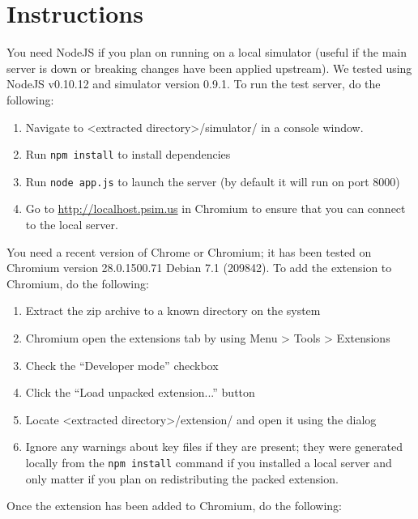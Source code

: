 \documentclass[12pt]{article}
\begin{document}
\maketitle
\section{Instructions}

You need NodeJS if you plan on running on a local simulator (useful if the main server is down or breaking changes have been applied upstream).  We tested using NodeJS v0.10.12 and simulator version 0.9.1.  To run the test server, do the following:

\begin{enumerate}
  \item Navigate to \textless{}extracted directory\textgreater{}/simulator/ in a console window.
  \item Run \texttt{npm install} to install dependencies
  \item Run \texttt{node app.js} to launch the server (by default it will run on port 8000)
  \item Go to \url{http://localhost.psim.us} in Chromium to ensure that you can connect to the local server.
\end{enumerate}

You need a recent version of Chrome or Chromium; it has been tested on Chromium version 28.0.1500.71 Debian 7.1 (209842). To add the extension to Chromium, do the following:

\begin{enumerate}
  \item Extract the zip archive to a known directory on the system
  \item Chromium open the extensions tab by using Menu \textgreater{} Tools \textgreater{} Extensions
  \item Check the ``Developer mode'' checkbox
  \item Click the ``Load unpacked extension...'' button
  \item Locate \textless{}extracted directory\textgreater{}/extension/ and open it using the dialog
  \item Ignore any warnings about key files if they are present; they were generated locally from the \texttt{npm install} command if you installed a local server and only matter if you plan on redistributing the packed extension.
\end{enumerate}

Once the extension has been added to Chromium, do the following:
\end{document}
